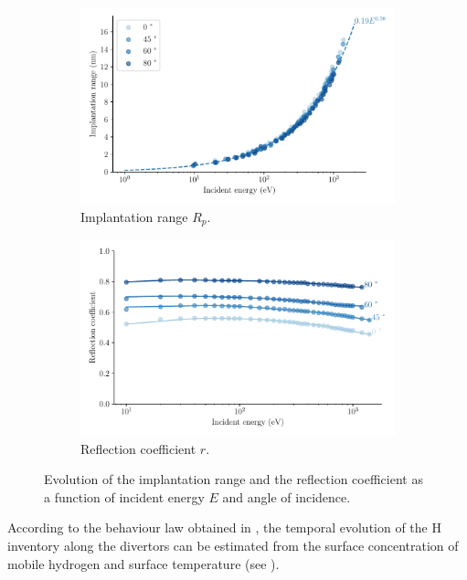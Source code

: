 \begin{figure}[h]
    \centering
    \begin{subfigure}{0.5\linewidth}
        \includegraphics[width=\linewidth]{Figures/Chapter4/implantation_range.pdf}
        \caption{Implantation range $R_p$.}
    \end{subfigure}%
    \begin{subfigure}{0.5\linewidth}                          
        \includegraphics[width=\linewidth]{Figures/Chapter4/reflection_coeff.pdf}
        \caption{Reflection coefficient $r$.}
    \end{subfigure}
    \caption{Evolution of the implantation range and the reflection coefficient as a function of incident energy $E$ and angle of incidence.}
\end{figure}

According to the behaviour law obtained in , the temporal evolution of the \gls{H} \gls{inventory} along the \glspl{divertor} can be estimated from the surface concentration of mobile hydrogen and surface temperature (see ).

